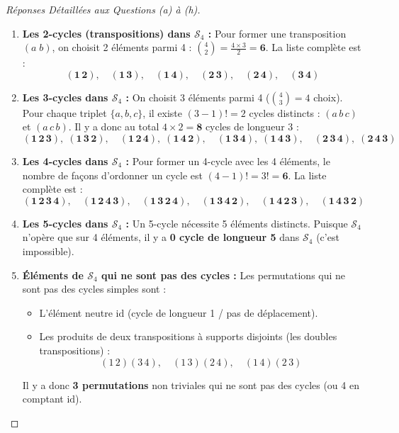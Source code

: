 \documentclass[12pt,a4paper]{report}
\begin{document}
\begin{proof}[Réponses Détaillées aux Questions (a) à (h)]
\begin{enumerate}
    \item[(a)] \textbf{Les 2-cycles (transpositions) dans $\mathcal{S}_4$ :}  
    Pour former une transposition $(a \; b)$, on choisit 2 éléments parmi 4 : $\binom{4}{2} = \frac{4 \times 3}{2} = \mathbf{6}$.  
    La liste complète est :
    \[ \mathbf{(1\,2), \quad (1\,3), \quad (1\,4), \quad (2\,3), \quad (2\,4), \quad (3\,4)} \]

    \item[(b)] \textbf{Les 3-cycles dans $\mathcal{S}_4$ :}  
    On choisit 3 éléments parmi 4 ($\binom{4}{3} = 4$ choix). Pour chaque triplet $\{a, b, c\}$, il existe $(3-1)! = 2$ cycles distincts : $(a\,b\,c)$ et $(a\,c\,b)$.  
    Il y a donc au total $4 \times 2 = \mathbf{8}$ cycles de longueur 3 :
    \[ \mathbf{(1\,2\,3), \; (1\,3\,2), \quad (1\,2\,4), \; (1\,4\,2), \quad (1\,3\,4), \; (1\,4\,3), \quad (2\,3\,4), \; (2\,4\,3)} \]

    \item[(c)] \textbf{Les 4-cycles dans $\mathcal{S}_4$ :}  
    Pour former un 4-cycle avec les 4 éléments, le nombre de façons d'ordonner un cycle est $(4-1)! = 3! = \mathbf{6}$.  
    La liste complète est :
    \[ \mathbf{(1\,2\,3\,4), \quad (1\,2\,4\,3), \quad (1\,3\,2\,4), \quad (1\,3\,4\,2), \quad (1\,4\,2\,3), \quad (1\,4\,3\,2)} \]

    \item[(d)] \textbf{Les 5-cycles dans $\mathcal{S}_4$ :}  
    Un 5-cycle nécessite 5 éléments distincts. Puisque $\mathcal{S}_4$ n'opère que sur 4 éléments, il y a \textbf{0 cycle de longueur 5} dans $\mathcal{S}_4$ (c'est impossible).

    \item[(e)] \textbf{Éléments de $\mathcal{S}_4$ qui ne sont pas des cycles :}  
    Les permutations qui ne sont pas des cycles simples sont :
    \begin{itemize}
        \item L'élément neutre $\mathrm{id}$ (cycle de longueur 1 / pas de déplacement).
        \item Les produits de deux transpositions à supports disjoints (les doubles transpositions) :
        \[ (1\,2)(3\,4), \quad (1\,3)(2\,4), \quad (1\,4)(2\,3) \]
    \end{itemize}
    Il y a donc \textbf{3 permutations} non triviales qui ne sont pas des cycles (ou 4 en comptant $\mathrm{id}$).


\end{enumerate}
\end{proof}
\end{document}
